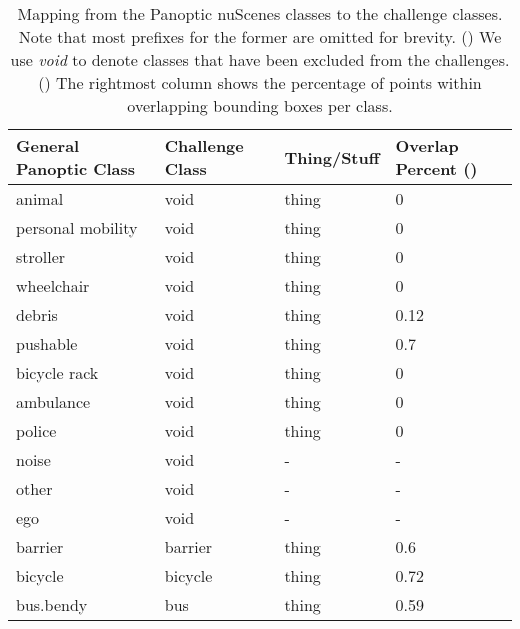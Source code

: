 \documentclass[letterpaper, 10 pt, journal, twoside]{IEEEtran}
\begin{document}
\begin{table}
\setlength\tabcolsep{2.0pt}
\footnotesize
\centering
\caption{Mapping from the Panoptic nuScenes classes to the challenge classes. Note that most prefixes for the former are omitted for brevity. () We use \emph{void} to denote classes that have been excluded from the challenges. () The rightmost column shows the percentage of points within overlapping bounding boxes per class.}
\begin{tabular}{|l | C{2.0cm} | C{1.5cm}| C{1.5cm} |}
\toprule
General Panoptic Class &  Challenge Class &  Thing/Stuff & Overlap Percent () \\ 
\midrule
animal                                   &   void                  & thing    & 0      \\
personal mobility                        &   void                  & thing   & 0       \\
stroller                                 &   void                  & thing   & 0       \\
wheelchair                               &   void                  & thing  & 0        \\
debris                                   &   void                  & thing  & 0.12        \\
pushable                                 &   void                  & thing  & 0.7        \\
bicycle rack                             &   void                  & thing  & 0        \\ 
ambulance                                &   void                  & thing  & 0        \\ 
police                                   &   void                  & thing  & 0        \\
noise                                    &   void                  & -    & -          \\ 
other                                    &   void                  & -    & -          \\ 
ego                                      &   void                  & -    & -          \\ 
barrier                                  &   barrier               & thing  & 0.6        \\ 
bicycle                                  &   bicycle               & thing  & 0.72        \\ 
bus.bendy                                &   bus                   & thing   & 0.59       \\ 

\end{tabular}
\end{table}
\end{document}
